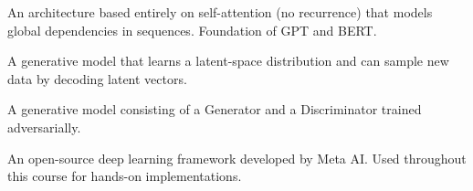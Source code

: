 \documentclass[12pt,a4paper]{article}
\begin{document}
\begin{description}[style=nextline]
  \item[Transformer]
    An architecture based entirely on self-attention (no recurrence) that
    models global dependencies in sequences.  Foundation of GPT and BERT.

  \item[Variational Autoencoder (VAE)]
    A generative model that learns a latent-space distribution and can
    sample new data by decoding latent vectors.

  \item[Generative Adversarial Network (GAN)]
    A generative model consisting of a Generator and a Discriminator
    trained adversarially.

  \item[PyTorch]
    An open-source deep learning framework developed by Meta AI.  Used
    throughout this course for hands-on implementations.
\end{description}
\end{document}
